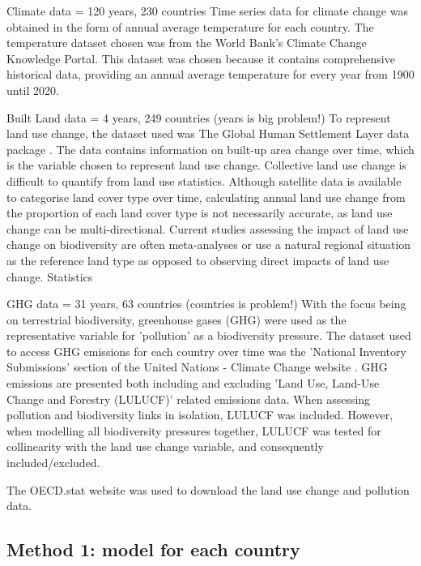 \documentclass[11pt, a4paper, titlepage]{article}
\begin{document}
	Climate data = 120 years, 230 countries
	Time series data for climate change was obtained in the form of annual average temperature for each country. The temperature dataset chosen was from the World Bank's Climate Change Knowledge Portal. This dataset was chosen because it contains comprehensive historical data, providing an annual average temperature for every year from 1900 until 2020. \newline
	
	Built Land data = 4 years, 249 countries (years is big problem!)
	To represent land use change, the dataset used was The Global Human Settlement Layer data package \cite{JRC117104}. The data contains information on built-up area change over time, which is the variable chosen to represent land use change. Collective land use change is difficult to quantify from land use statistics. Although satellite data is available to categorise land cover type over time, calculating annual land use change from the proportion of each land cover type is not necessarily accurate, as land use change can be multi-directional. Current studies assessing the impact of land use change on biodiversity are often meta-analyses or use a natural regional situation as the reference land type \cite{de2013land} as opposed to observing direct impacts of land use change. Statistics \newline
	
	GHG data = 31 years, 63 countries (countries is problem!)
	With the focus being on terrestrial biodiversity, greenhouse gases (GHG) were used as the representative variable for 'pollution' as a biodiversity pressure. The dataset used to access GHG emissions for each country over time was the 'National Inventory Submissions' section of the United Nations - Climate Change website \cite{united nations}. GHG emissions are presented both including and excluding 'Land Use, Land-Use Change and Forestry (LULUCF)' related emissions data. When assessing pollution and biodiversity links in isolation, LULUCF was included. However, when modelling all biodiversity pressures together, LULUCF was tested for collinearity with the land use change variable, and consequently included/excluded. \newline
	
	The OECD.stat website was used to download the land use change and pollution data. \newline

	\subsection*{Method 1: model for each country}
\end{document}
